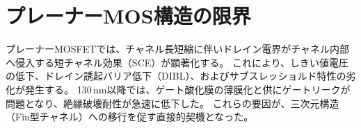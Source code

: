 \section{プレーナーMOS構造の限界}
プレーナーMOSFETでは、チャネル長短縮に伴いドレイン電界がチャネル内部へ侵入する短チャネル効果（SCE）が顕著化する。  
これにより、しきい値電圧の低下、ドレイン誘起バリア低下（DIBL）、およびサブスレッショルド特性の劣化が発生する。  
130\,nm以降では、ゲート酸化膜の薄膜化と供にゲートリークが問題となり、絶縁破壊耐性が急速に低下した。
これらの要因が、三次元構造（Fin型チャネル）への移行を促す直接的契機となった。

